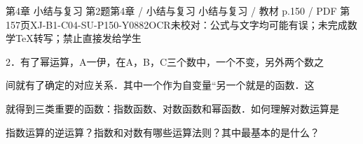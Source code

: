 \begin{bankitem}{第4章 小结与复习 第2题}{第4章 / 小结与复习 小结与复习 / 教材 p.150 / PDF 第157页}{XJ-B1-C04-SU-P150-Y0882}{OCR未校对：公式与文字均可能有误；未完成数学TeX转写；禁止直接发给学生}
\begin{ocrdraft}
\par
2．有了幂运算，A一伊，在A，B，C三个数中，一个不变，另外两个数之
\par
间就有了确定的对应关系．其中一个作为自变量“另一个就是的函数．这
\par
就得到三类重要的函数：指数函数、对数函数和幂函数．如何理解对数运算是
\par
指数运算的逆运算？指数和对数有哪些运算法则？其中最基本的是什么？
\end{ocrdraft}
\end{bankitem}
